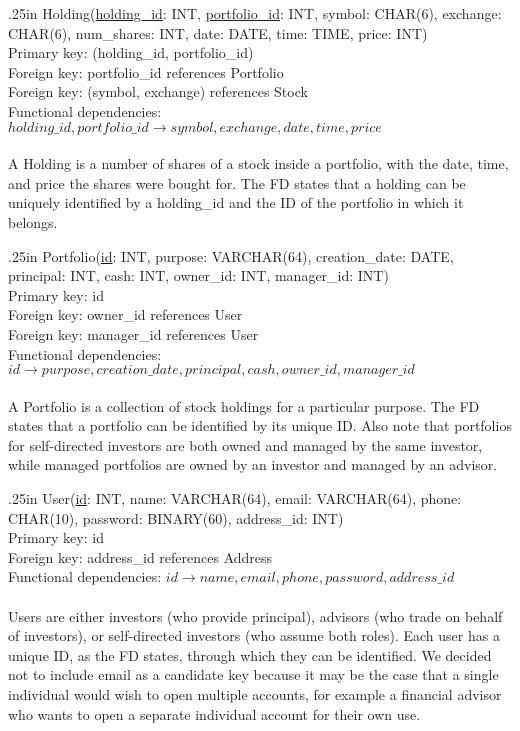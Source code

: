 \documentclass[letterpaper]{report}
\begin{document}
\hangindent .25in
{\sffamily Holding(\underline{holding\_id}: INT, \underline{portfolio\_id}: INT, symbol: CHAR(6), exchange: CHAR(6), num\_shares: INT, date: DATE, time: TIME, price: INT)} \\
Primary key: {\sffamily (holding\_id, portfolio\_id)} \\
Foreign key: {\sffamily portfolio\_id} references {\sffamily Portfolio} \\
Foreign key: {\sffamily (symbol, exchange)} references {\sffamily Stock} \\
Functional dependencies: $holding\_id, portfolio\_id \to symbol, exchange, date, time, price$ \\\\
A {\sffamily Holding} is a number of shares of a stock inside a portfolio, with the date, time, and price the shares were bought for. The FD states that a holding can be uniquely identified by a {\sffamily holding\_id} and the ID of the portfolio in which it belongs.

\hangindent .25in
{\sffamily Portfolio(\underline{id}: INT, purpose: VARCHAR(64), creation\_date: DATE, principal: INT, cash: INT, owner\_id: INT, manager\_id: INT)} \\
Primary key: {\sffamily id} \\
Foreign key: {\sffamily owner\_id} references {\sffamily User} \\
Foreign key: {\sffamily manager\_id} references {\sffamily User} \\
Functional dependencies: $id \to purpose, creation\_date, principal, cash, owner\_id, manager\_id$ \\\\
A {\sffamily Portfolio} is a collection of stock holdings for a particular purpose. The FD states that a portfolio can be identified by its unique ID. Also note that portfolios for self-directed investors are both owned and managed by the same investor, while managed portfolios are owned by an investor and managed by an advisor.


\hangindent .25in
{\sffamily User(\underline{id}: INT, name: VARCHAR(64), email: VARCHAR(64), phone: CHAR(10), password: BINARY(60), address\_id: INT)}\\
Primary key: {\sffamily id} \\
Foreign key: {\sffamily address\_id} references {\sffamily Address} \\
Functional dependencies: $id \to name, email, phone, password, address\_id$ \\\\
{\sffamily User}s are either investors (who provide principal), advisors (who trade on behalf of investors), or self-directed investors (who assume both roles). Each user has a unique ID, as the FD states, through which they can be identified. We decided not to include \textsf{email} as a candidate key because it may be the case that a single individual would wish to open multiple accounts, for example a financial advisor who wants to open a separate individual account for their own use.
\end{document}
